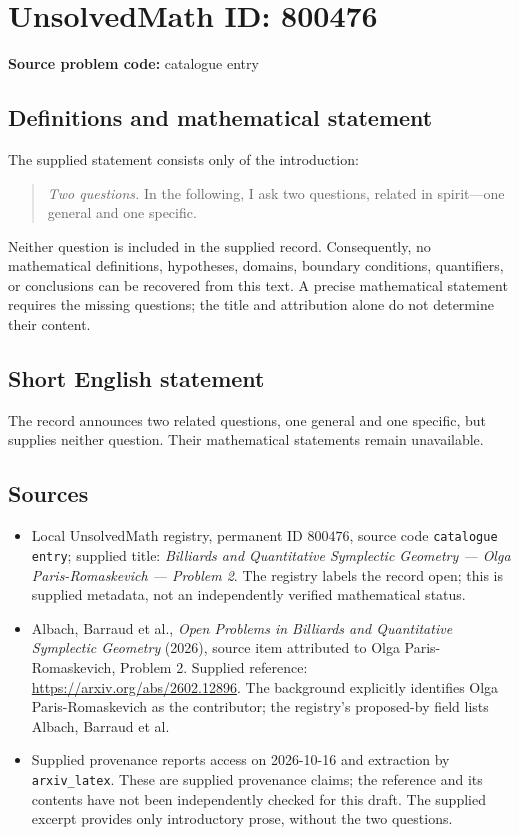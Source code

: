 \documentclass[11pt]{article}
\begin{document}
\section*{UnsolvedMath ID: 800476}
\textbf{Source problem code:} catalogue entry
\subsection{Definitions and mathematical statement}
The supplied statement consists only of the introduction: \begin{quote}\emph{Two questions.} In the following, I ask two questions, related in spirit---one general and one specific.\end{quote}
Neither question is included in the supplied record. Consequently, no mathematical definitions, hypotheses, domains, boundary conditions, quantifiers, or conclusions can be recovered from this text. A precise mathematical statement requires the missing questions; the title and attribution alone do not determine their content.
\subsection{Short English statement}
The record announces two related questions, one general and one specific, but supplies neither question. Their mathematical statements remain unavailable.
\subsection{Sources}
\begin{itemize}
\item Local UnsolvedMath registry, permanent ID \(800476\), source code \texttt{catalogue entry}; supplied title: \emph{Billiards and Quantitative Symplectic Geometry --- Olga Paris-Romaskevich --- Problem 2}. The registry labels the record open; this is supplied metadata, not an independently verified mathematical status.
\item Albach, Barraud et al., \emph{Open Problems in Billiards and Quantitative Symplectic Geometry} (2026), source item attributed to Olga Paris-Romaskevich, Problem 2. Supplied reference: \url{https://arxiv.org/abs/2602.12896}. The background explicitly identifies Olga Paris-Romaskevich as the contributor; the registry's proposed-by field lists Albach, Barraud et al.
\item Supplied provenance reports access on 2026-10-16 and extraction by \texttt{arxiv\_latex}. These are supplied provenance claims; the reference and its contents have not been independently checked for this draft. The supplied excerpt provides only introductory prose, without the two questions.
\end{itemize}
\end{document}
